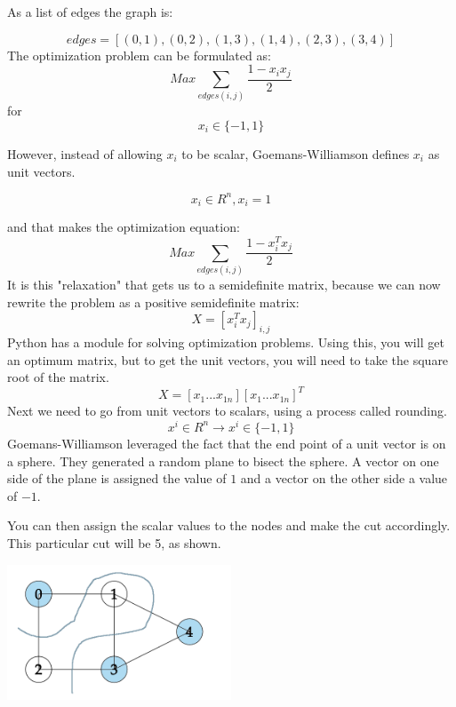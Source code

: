 
As a list of edges the graph is:

$$ edges = [(0,1),
        (0,2),
        (1,3),
        (1,4),
        (2,3),
        (3,4)] $$
The optimization problem can be formulated as:
$$
Max\sum_{edges(i,j)}{}\frac{1 - x_{i}x_{j}}{2}
$$
for
$$
 x_{i}\in \{ -1,1 \}
$$

However, instead of allowing $x_{i}$ to be scalar, Goemans-Williamson defines $x_{i}$ as unit vectors.

$$
 x_{i}\in R^n, x_{i}=1 
$$

and that makes the optimization equation:
$$
Max\sum_{edges(i,j)}{}\frac{1 - x_{i}^{T}x_{j}}{2}
$$
It is this "relaxation" that gets us to a semidefinite matrix, because we can now rewrite the problem as a positive semidefinite matrix:
$$
X = \left[ x_{i}^{T}x_{j} \right]_{i,j}
$$
Python has a module for solving optimization problems. Using this, you will get an optimum matrix, but to get the unit vectors, you will need to take the square root of the matrix. 
$$
X = \left[ x_{1}...x_{1n} \right]\left[ x_{1}...x_{1n} \right]^{T}
$$
Next we need to go from unit vectors to scalars, using a process called rounding.
$$
x^{i}\in R^n \to x^{i}\in \{ -1,1 \}
$$
Goemans-Williamson leveraged the fact that the end point of a unit vector is on a sphere. They generated a random plane to bisect the sphere. A vector on one side of the plane is assigned the value of $1$ and a vector on the other side a value of $-1$.

You can then assign the scalar values to the nodes and make the cut accordingly. This particular cut will be 5, as shown.

\includegraphics[width=0.5\textwidth]{max-cut.png}

